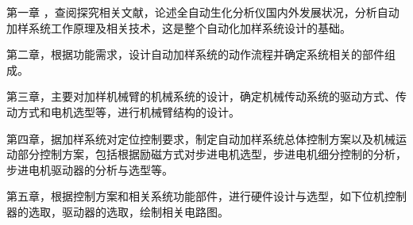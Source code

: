第一章 ，查阅探究相关文献，论述全自动生化分析仪国内外发展状况，分析自动加样系统工作原理及相关技术，这是整个自动化加样系统设计的基础。

第二章，根据功能需求，设计自动加样系统的动作流程并确定系统相关的部件组成。

第三章，主要对加样机械臂的机械系统的设计，确定机械传动系统的驱动方式、传动方式和电机选型等，进行机械臂结构的设计。

第四章，据加样系统对定位控制要求，制定自动加样系统总体控制方案以及机械运动部分控制方案，包括根据励磁方式对步进电机选型，步进电机细分控制的分析，步进电机驱动器的分析与选型等。

第五章，根据控制方案和相关系统功能部件，进行硬件设计与选型，如下位机控制器的选取，驱动器的选取，绘制相关电路图。


